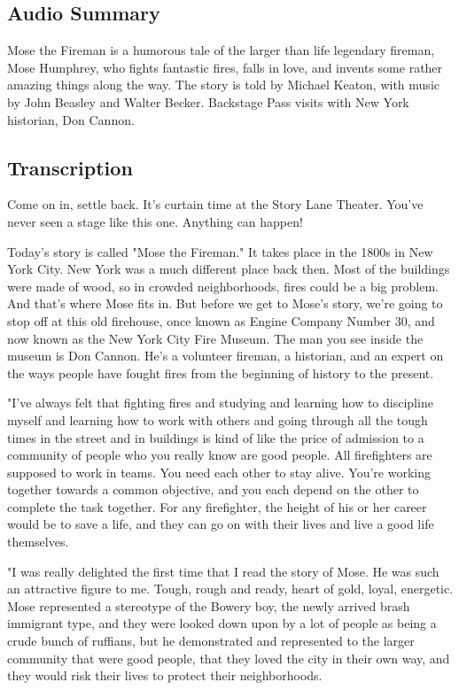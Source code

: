 \subsection{Audio Summary}

Mose the Fireman is a humorous tale of the larger than life legendary fireman, Mose Humphrey, who fights fantastic fires, falls in love, and invents some rather amazing things along the way. The story is told by Michael Keaton, with music by John Beasley and Walter Becker. Backstage Pass visits with New York historian, Don Cannon.

\subsection{Transcription}

Come on in, settle back. It's curtain time at the Story Lane Theater. You've never seen a stage like this one. Anything can happen!

Today's story is called "Mose the Fireman." It takes place in the 1800s in New York City. New York was a much different place back then. Most of the buildings were made of wood, so in crowded neighborhoods, fires could be a big problem. And that's where Mose fits in. But before we get to Mose's story, we're going to stop off at this old firehouse, once known as Engine Company Number 30, and now known as the New York City Fire Museum. The man you see inside the museum is Don Cannon. He's a volunteer fireman, a historian, and an expert on the ways people have fought fires from the beginning of history to the present.

"I've always felt that fighting fires and studying and learning how to discipline myself and learning how to work with others and going through all the tough times in the street and in buildings is kind of like the price of admission to a community of people who you really know are good people. All firefighters are supposed to work in teams. You need each other to stay alive. You're working together towards a common objective, and you each depend on the other to complete the task together. For any firefighter, the height of his or her career would be to save a life, and they can go on with their lives and live a good life themselves.

"I was really delighted the first time that I read the story of Mose. He was such an attractive figure to me. Tough, rough and ready, heart of gold, loyal, energetic. Mose represented a stereotype of the Bowery boy, the newly arrived brash immigrant type, and they were looked down upon by a lot of people as being a crude bunch of ruffians, but he demonstrated and represented to the larger community that were good people, that they loved the city in their own way, and they would risk their lives to protect their neighborhoods.

